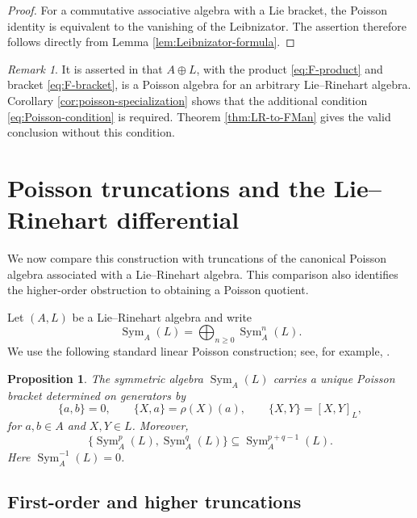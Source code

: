 \documentclass[12pt,reqno]{amsart}
\newtheorem{proposition}[theorem]{Proposition}
\theoremstyle{definition}
\theoremstyle{remark}
\newtheorem{remark}[theorem]{Remark}
\newcommand{\Sym}{\operatorname{Sym}}
\begin{document}
	\begin{proof}
		For a commutative associative algebra with a Lie bracket, the Poisson identity
		is equivalent to the vanishing of the Leibnizator.  The assertion therefore
		follows directly from Lemma \ref{lem:Leibnizator-formula}.
	\end{proof}
	
	\begin{remark}\label{rem:LV-poisson-claim}
		It is asserted in \cite[Proposition 13.3.26]{LodayVallette} that $A\oplus L$,
		with the product \eqref{eq:F-product} and bracket \eqref{eq:F-bracket}, is a
		Poisson algebra for an arbitrary Lie--Rinehart algebra.  Corollary
		\ref{cor:poisson-specialization} shows that the additional condition
		\eqref{eq:Poisson-condition} is required.  Theorem
		\ref{thm:LR-to-FMan} gives the valid conclusion without this condition.
	\end{remark}
	
	
	
	
	
	\section{Poisson truncations and the Lie--Rinehart differential}
	\label{sec:ideal}
	
	We now compare this construction with truncations of the canonical
	Poisson algebra associated with a Lie--Rinehart algebra.  This comparison
	also identifies the higher-order obstruction to obtaining a Poisson
	quotient.
	
	Let $(A,L)$ be a Lie--Rinehart algebra and write
	\[
	\Sym_A(L)=\bigoplus_{n\geq0}\Sym_A^n(L).
	\]
	We use the following standard linear Poisson construction; see, for example,
	\cite{Huebschmann1990,Huebschmann1998}.
	
	\begin{proposition}\label{prop:linear-poisson-prelim}
		The symmetric algebra $\Sym_A(L)$ carries a unique Poisson bracket
		determined on generators by
		\begin{equation}\label{eq:linear-poisson}
			\{a,b\}=0,
			\qquad
			\{X,a\}=\rho(X)(a),
			\qquad
			\{X,Y\}=[X,Y]_L,
		\end{equation}
		for $a,b\in A$ and $X,Y\in L$.  Moreover,
		\[
		\{\Sym_A^p(L),\Sym_A^q(L)\}\subseteq \Sym_A^{p+q-1}(L).
		\]
		Here $\Sym_A^{-1}(L)=0$.
	\end{proposition}
	
	\subsection{First-order and higher truncations}
	
\end{document}
